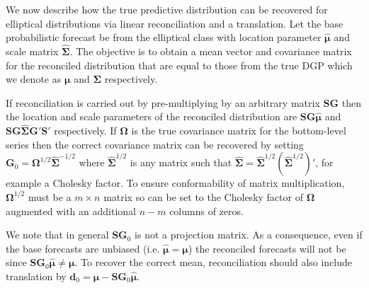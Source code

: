 \documentclass[12pt]{article}
\theoremstyle{definition}
\begin{document}
We now describe how the true predictive distribution can be recovered for elliptical distributions via linear reconciliation and a translation.  Let the base probabilistic forecast be from the elliptical class with location parameter $\hat{\bm{\mu}}$ and scale matrix $\hat{\bm{\Sigma}}$. The objective is to obtain a mean vector and covariance matrix for the reconciled distribution that are equal to those from the true DGP which we denote as $\bm{\mu}$ and $\bm{\Sigma}$ respectively.

If reconciliation is carried out by pre-multiplying by an arbitrary matrix $\bm{S}\bm{G}$ then the location and scale parameters of the reconciled distribution are $\bm{S}\bm{G}\hat{\bm{\mu}}$ and $\bm{S}\bm{G}\hat{\bm{\Sigma}}{\bm{G}}'\bm{S}'$ respectively.  If ${\bm\Omega}$ is the true covariance matrix for the bottom-level series then the correct covariance matrix can be recovered by setting ${\bm G}_0={\bm{\Omega}}^{1/2}\hat{\bm \Sigma}^{-1/2}$ where $\hat{\bm \Sigma}^{1/2}$ is any matrix such that $\hat{\bm \Sigma}=\hat{\bm \Sigma}^{1/2}(\hat{\bm \Sigma}^{1/2})'$, for example a Cholesky factor. To ensure conformability of matrix multiplication, ${\bm{\Omega}}^{1/2}$ must be a $m\times n$ matrix so can be set to the Cholesky factor of ${\bm{\Omega}}$ augmented with an additional $n-m$ columns of zeros.

We note that in general ${\bm S}{\bm G}_0$ is not a projection matrix.  As a consequence, even if the base forecasts are unbiased (i.e. $\hat{\bm{\mu}}=\bm{\mu}$) the reconciled forecasts will not be since ${\bm S}{\bm G}_{0}\hat{\bm{\mu}}\neq\bm{\mu}$.  To recover the correct mean, reconciliation should also include translation by ${\bm d}_{0}={\bm\mu}-{\bm S}{\bm G}_{0}\hat{\bm{\mu}}$.
\end{document}
